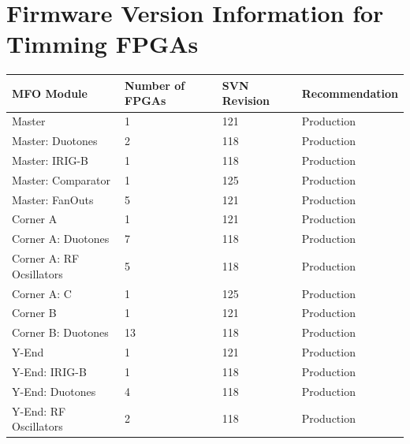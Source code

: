 \documentclass{article}
\begin{document}
\section{Firmware Version Information for Timming FPGAs}
\label{sec:firmware}
\begin{center}
  \begin{tabular}{ | l | l | l | l | }
    \hline
    \textbf{MFO Module}                 & \textbf{Number of FPGAs} & \textbf{SVN Revision}  & \textbf{Recommendation} \\ \hline
    Master                & 1         & 121                    & Production \\ \hline
    Master: Duotones                & 2         & 118                    & Production \\ \hline
    Master: IRIG-B                & 1         & 118                    & Production \\ \hline
    Master: Comparator                & 1         & 125                    & Production \\ \hline
    Master: FanOuts              & 5         & 121                    & Production \\ \hline
    Corner A                & 1         & 121                    & Production \\ \hline
    Corner A: Duotones                  & 7         & 118                     & Production \\ \hline
    Corner A: RF Ocsillators                        & 5         & 118                     &  Production\\ \hline
    Corner A: C                           & 1         & 125                     & Production \\ \hline
    Corner B   & 1         & 121                     & Production \\ \hline
    Corner B: Duotones                            & 13       & 118                     & Production \\ \hline
    Y-End                     & 1       & 121                     & Production \\ \hline
    Y-End: IRIG-B                             & 1       & 118                     & Production \\ \hline
    Y-End: Duotones                             & 4       & 118                     & Production \\ \hline
    Y-End: RF Oscillators                 & 2         & 118               & Production \\ \hline

\end{tabular}
\end{center}
\end{document}
